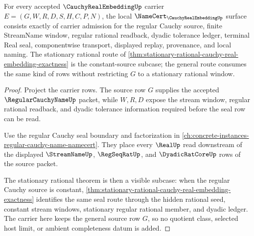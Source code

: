 \begin{theorem}
\label{thm:cauchy-real-embedding-namecert-obligations}
For every accepted $\CauchyRealEmbeddingUp$ carrier $E=(G,W,R,D,S,H,C,P,N)$, the local $\NameCert_{\CauchyRealEmbeddingUp}$ surface consists exactly of carrier admission for the regular Cauchy source, finite StreamName window, regular rational readback, dyadic tolerance ledger, terminal Real seal, componentwise transport, displayed replay, provenance, and local naming. The stationary rational route of \autoref{thm:stationary-rational-cauchy-real-embedding-exactness} is the constant-source subcase; the general route consumes the same kind of rows without restricting $G$ to a stationary rational window.
\end{theorem}
\begin{proof}
Project the carrier rows. The source row $G$ supplies the accepted $\RegularCauchyNameUp$ packet, while $W,R,D$ expose the stream window, regular rational readback, and dyadic tolerance information required before the seal row can be read.

Use the regular Cauchy seal boundary and factorization in \autoref{ch:concrete-instances-regular-cauchy-name-namecert}. They place every $\RealUp$ read downstream of the displayed $\StreamNameUp$, $\RegSeqRatUp$, and $\DyadicRatCoreUp$ rows of the source packet.

The stationary rational theorem is then a visible subcase: when the regular Cauchy source is constant, \autoref{thm:stationary-rational-cauchy-real-embedding-exactness} identifies the same seal route through the hidden rational seed, constant stream windows, stationary regular rational member, and dyadic ledger. The carrier here keeps the general source row $G$, so no quotient class, selected host limit, or ambient completeness datum is added.
\end{proof}

